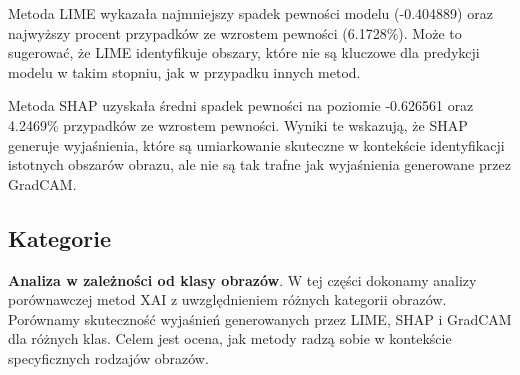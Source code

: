 Metoda LIME wykazała najmniejszy spadek pewności modelu (-0.404889) oraz najwyższy procent przypadków ze wzrostem pewności (6.1728\%).
Może to sugerować, że LIME identyfikuje obszary, które nie są kluczowe dla predykcji modelu w takim stopniu, jak w przypadku innych metod.

Metoda SHAP uzyskała średni spadek pewności na poziomie -0.626561 oraz 4.2469\% przypadków ze wzrostem pewności.
Wyniki te wskazują, że SHAP generuje wyjaśnienia, które są umiarkowanie skuteczne w kontekście identyfikacji istotnych obszarów obrazu, ale nie są tak trafne jak wyjaśnienia generowane przez GradCAM.

\subsection*{Kategorie}

\textbf{Analiza w zależności od klasy obrazów}.
W tej części dokonamy analizy porównawczej metod XAI z uwzględnieniem różnych kategorii obrazów.
Porównamy skuteczność wyjaśnień generowanych przez LIME, SHAP i GradCAM dla różnych klas.
Celem jest ocena, jak metody radzą sobie w kontekście specyficznych rodzajów obrazów.

